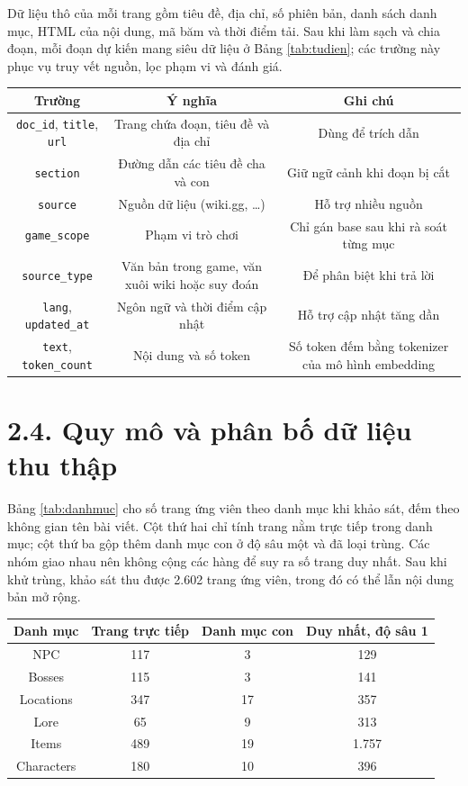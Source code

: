 Dữ liệu thô của mỗi trang gồm tiêu đề, địa chỉ, số phiên bản, danh sách danh mục, HTML của nội dung, mã băm và thời điểm tải. Sau khi làm sạch và chia đoạn, mỗi đoạn dự kiến mang siêu dữ liệu ở Bảng \ref{tab:tudien}; các trường này phục vụ truy vết nguồn, lọc phạm vi và đánh giá.


\begin{longtable*}{|C{0.22}|C{0.40}|C{0.38}|}
\hline \textbf{Trường} & \textbf{Ý nghĩa} & \textbf{Ghi chú} \\ \hline
\texttt{doc\_id}, \texttt{title}, \texttt{url} & Trang chứa đoạn, tiêu đề và địa chỉ & Dùng để trích dẫn \\ \hline
\texttt{section} & Đường dẫn các tiêu đề cha và con & Giữ ngữ cảnh khi đoạn bị cắt \\ \hline
\texttt{source} & Nguồn dữ liệu (wiki.gg, \ldots) & Hỗ trợ nhiều nguồn \\ \hline
\texttt{game\_scope} & Phạm vi trò chơi & Chỉ gán base sau khi rà soát từng mục \\ \hline
\texttt{source\_type} & Văn bản trong game, văn xuôi wiki hoặc suy đoán & Để phân biệt khi trả lời \\ \hline
\texttt{lang}, \texttt{updated\_at} & Ngôn ngữ và thời điểm cập nhật & Hỗ trợ cập nhật tăng dần \\ \hline
\texttt{text}, \texttt{token\_count} & Nội dung và số token & Số token đếm bằng tokenizer của mô hình embedding \\ \hline
\end{longtable*}
\tabend


\section{2.4. Quy mô và phân bố dữ liệu thu thập}

Bảng \ref{tab:danhmuc} cho số trang ứng viên theo danh mục khi khảo sát, đếm theo không gian tên bài viết. Cột thứ hai chỉ tính trang nằm trực tiếp trong danh mục; cột thứ ba gộp thêm danh mục con ở độ sâu một và đã loại trùng. Các nhóm giao nhau nên không cộng các hàng để suy ra số trang duy nhất. Sau khi khử trùng, khảo sát thu được 2.602 trang ứng viên, trong đó có thể lẫn nội dung bản mở rộng.


\begin{longtable*}{|C{0.28}|C{0.24}|C{0.22}|C{0.26}|}
\hline \textbf{Danh mục} & \textbf{Trang trực tiếp} & \textbf{Danh mục con} & \textbf{Duy nhất, độ sâu 1} \\ \hline
NPC & 117 & 3 & 129 \\ \hline
Bosses & 115 & 3 & 141 \\ \hline
Locations & 347 & 17 & 357 \\ \hline
Lore & 65 & 9 & 313 \\ \hline
Items & 489 & 19 & 1.757 \\ \hline
Characters & 180 & 10 & 396 \\ \hline
\end{longtable*}
\tabend


